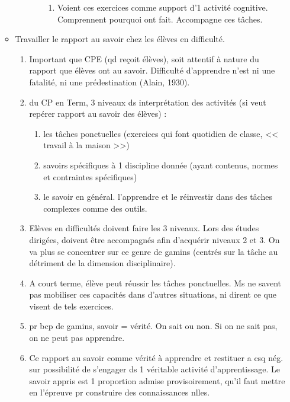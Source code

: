 \documentclass[12pt]{report}
\begin{document}
\begin{itemize}
\begin{itemize}
\begin{enumerate}
\begin{enumerate}
\begin{enumerate}
\item Voient ces exercices comme support d'1 activité cognitive. Comprennent pourquoi ont fait. Accompagne ces tâches.\\
\end{enumerate}
\end{enumerate}
\end{enumerate}

\item Travailler le rapport au savoir chez les élèves en difficulté.

\begin{enumerate}
\item Important que CPE (qd reçoit élèves), soit attentif à nature du rapport que élèves ont au savoir. Difficulté d'apprendre n'est ni une fatalité, ni une prédestination (Alain, 1930). \\
\item du CP en Term, 3 niveaux ds interprétation des activités (si veut repérer rapport au savoir des élèves) : \\
\begin{enumerate}
\item les tâches ponctuelles (exercices qui font quotidien de classe, << travail à la maison >>) \\
\item savoirs spécifiques à 1 discipline donnée (ayant contenus, normes et contraintes spécifiques)\\
\item le savoir en général. l'apprendre et le réinvestir dans des tâches complexes comme des outils. \\
\end{enumerate}

\item Elèves en difficultés doivent faire les 3 niveaux. Lors des études dirigées, doivent être accompagnés afin d'acquérir niveaux 2 et 3. On va plus se concentrer sur ce genre de gamins (centrés sur la tâche au détriment de la dimension disciplinaire).\\
\item A court terme, élève peut réussir les tâches ponctuelles. Ms ne savent pas mobiliser ces capacités dans d'autres situations, ni dirent ce que visent de tels exercices.\\
\item pr bcp de gamins, savoir = vérité. On sait ou non. Si on ne sait pas, on ne peut pas apprendre.\\
\item Ce rapport au savoir comme vérité à apprendre et restituer a csq nég. sur possibilité de s'engager ds 1 véritable activité d'apprentissage. Le savoir appris est 1 proportion admise provisoirement, qu'il faut mettre en l'épreuve pr construire des connaissances nlles.\\


\end{enumerate}
\end{itemize}
\end{itemize}
\end{document}

